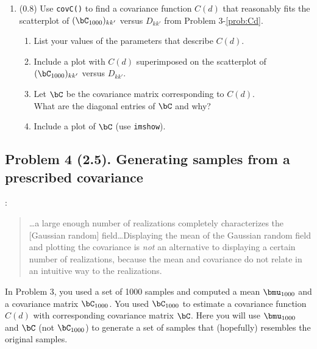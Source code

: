 \documentclass[11pt,titlepage,fleqn]{article}
\begin{document}
\begin{enumerate}

\item (0.8) Use \verb+covC()+ to find a covariance function $C(d)$ that reasonably fits the scatterplot of $(\bC_{1000})_{kk'}$ versus $D_{kk'}$ from Problem 3-\ref{prob:Cd}.
%
\begin{enumerate}
\item List your values of the parameters that describe $C(d)$.
\item Include a plot with $C(d)$ superimposed on the scatterplot of $(\bC_{1000})_{kk'}$ versus $D_{kk'}$.
\item Let $\bC$ be the covariance matrix corresponding to $C(d)$. \\
What are the diagonal entries of $\bC$ and why?
\item Include a plot of $\bC$ (use \verb+imshow+).
\end{enumerate}

\label{prob:covC}

\end{enumerate}


\pagebreak
\subsection*{Problem 4 (2.5). Generating samples from a prescribed covariance}

\citet[][p.~45]{Tarantola2005}:
%
\begin{quote}
\ldots a large enough number of realizations completely characterizes the [Gaussian random] field\ldots Displaying the mean of the Gaussian random field and plotting the covariance is {\em not} an alternative to displaying a certain number of realizations, because the mean and covariance do not relate in an intuitive way to the realizations.
\end{quote}

\noindent
In Problem 3, you used a set of 1000 samples and computed a mean $\bmu_{1000}$ and a covariance matrix $\bC_{1000}$. You used $\bC_{1000}$ to estimate a covariance function $C(d)$ with corresponding covariance matrix $\bC$. Here you will use $\bmu_{1000}$ and $\bC$ (not $\bC_{1000}$) to generate a set of samples that (hopefully) resembles the original samples.
\end{document}

